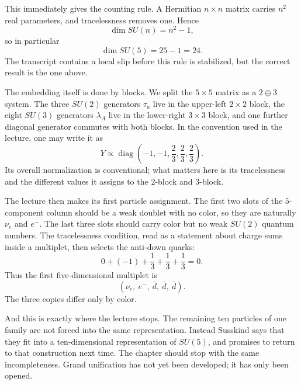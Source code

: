 This immediately gives the counting rule. A Hermitian \(n\times n\) matrix carries \(n^2\) real parameters, and tracelessness removes one. Hence
\begin{equation}
\dim SU(n)=n^2-1,
\end{equation}
so in particular
\begin{equation}
\dim SU(5)=25-1=24.
\end{equation}
The transcript contains a local slip before this rule is stabilized, but the correct result is the one above.

The embedding itself is done by blocks. We split the \(5\times 5\) matrix as a \(2\oplus 3\) system. The three \(SU(2)\) generators \(\tau_a\) live in the upper-left \(2\times 2\) block, the eight \(SU(3)\) generators \(\lambda_A\) live in the lower-right \(3\times 3\) block, and one further diagonal generator commutes with both blocks. In the convention used in the lecture, one may write it as
\begin{equation}
Y\propto
\operatorname{diag}
\left(
-1,-1,\frac{2}{3},\frac{2}{3},\frac{2}{3}
\right).
\end{equation}
Its overall normalization is conventional; what matters here is its tracelessness and the different values it assigns to the \(2\)-block and \(3\)-block.

The lecture then makes its first particle assignment. The first two slots of the \(5\)-component column should be a weak doublet with no color, so they are naturally \(\nu_e\) and \(e^-\). The last three slots should carry color but no weak \(SU(2)\) quantum numbers. The tracelessness condition, read as a statement about charge sums inside a multiplet, then selects the anti-down quarks:
\begin{equation}
0+(-1)+\frac{1}{3}+\frac{1}{3}+\frac{1}{3}=0.
\end{equation}
Thus the first five-dimensional multiplet is
\begin{equation}
(\nu_e,\ e^-,\ \bar d,\ \bar d,\ \bar d).
\end{equation}
The three copies differ only by color.

And this is exactly where the lecture stops. The remaining ten particles of one family are not forced into the same representation. Instead Susskind says that they fit into a ten-dimensional representation of \(SU(5)\), and promises to return to that construction next time. The chapter should stop with the same incompleteness. Grand unification has not yet been developed; it has only been opened.

